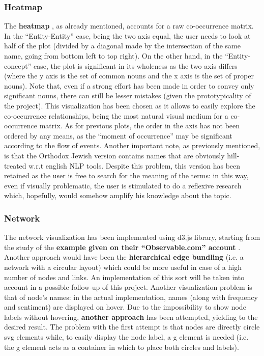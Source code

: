 \documentclass[sigchi]{article}
\begin{document}
\subsubsection{Heatmap}
The \textbf{heatmap} \cite{heatmap}, as already mentioned, accounts for a raw co-occurrence matrix. In the “Entity-Entity” case, being the two axis equal, the user needs to look at half of the plot (divided by a diagonal made by the intersection of the same name, going from bottom left to top right). On the other hand, in the “Entity-concept” case, the plot is significant in its wholeness as the two axis differs (where the y axis is the set of common nouns and the x axis is the set of proper nouns). Note that, even if a strong effort has been made in order to convey only significant nouns, there can still be lesser mistakes (given the prototypicality of the project). This visualization has been chosen as it allows to easily explore the co-occurrence relationships, being the most natural visual medium for a co-occurrence matrix. As for previous plots, the order in the axis has not been ordered by any means, as the “moment of occurrence” may be significant according to the flow of events. Another important note, as previously mentioned, is that the Orthodox Jewish version contains names that are obviously hill-treated w.r.t english NLP tools. Despite this problem, this version has been retained as the user is free to search for the meaning of the terms: in this way, even if visually problematic, the user is stimulated to do a reflexive research which, hopefully, would somehow amplify his knowledge about the topic.
\subsubsection{Network}
The network visualization has been implemented using d3.js library, starting from the study of the \textbf{example given on their “Observable.com” account} \cite{networknolabel}. Another approach would have been the \textbf{hierarchical edge bundling} \cite{hieredgebundling} (i.e. a network with a circular layout) which could be more useful in case of a high number of nodes and links. An implementation of this sort will be taken into account in a possible follow-up of this project. Another visualization problem is that of node’s names: in the actual implementation, names (along with frequency and sentiment) are displayed on hover. Due to the impossibility to show node labels without hovering, \textbf{another approach} \cite{networklabel} has been attempted, yielding to the desired result.
The problem with the first attempt is that nodes are directly circle svg elements while, to easily display the node label, a g element is needed (i.e. the g element acts as a container in which to place both circles and labels). 
\end{document}
